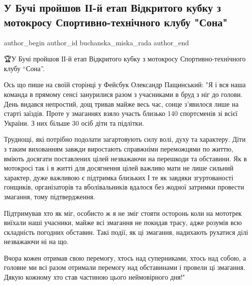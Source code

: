  
 
 
 
 

\subsection{У Бучі пройшов ІІ-й етап Відкритого кубку з мотокросу Спортивно-технічного клубу "Сона"}
\label{sec:26_07_2020.fb.buchanska_miska_rada.1.bucha_motokross}

\ifcmt
 author_begin
   author_id buchanska_miska_rada
 author_end
\fi

🏆У Бучі пройшов ІІ-й етап Відкритого кубку з мотокросу Спортивно-технічного
клубу \enquote{Сона}. 

Ось що пише на своїй сторінці у Фейсбук Олександр Пащинський: "Я і вся наша
команда в прямому сенсі занурилися разом з учасниками в бруд з ніг до голови.
День видався непростий, дощ тривав майже весь час, сонце з'явилося лише на
старті заїздів. Проте у змаганнях взяло участь близько 140 спортсменів зі всієї
України. З них більше 30 осіб діти та підлітки. 

Труднощі, які потрібно подолати загартовують силу волі, духу та характеру. Діти
з таким вихованням завжди виростають справжніми переможцями по життю, вміють
досягати поставлених цілей незважаючи на перешкоди та обставини. Як в мотокросі
так і в житті для досягнення цілей важливо мати не лише сильний характер, дуже
важливою є підтримка близьких І те як завдяки згуртованості гонщиків,
організаторів та вболівальників вдалося без жодної затримки провести змагання,
тому підтвердження. 

Підтримував хто як міг, особисто ж я не зміг стояти осторонь коли на мототрек
виїхали наші учасники, майже всі змагання не покидав трасу, адже розумів всю
складність погодних обставин. Такі події, як ці змагання, надихають рухатися
ділі незважаючи ні на що. 

Вчора кожен отримав свою перемогу, хтось над суперниками, хтось над собою, а
головне ми всі разом отримали перемогу над обставинами і провели ці змагання.
Дякую кожному хто став частиною цього неймовірного дня!"
